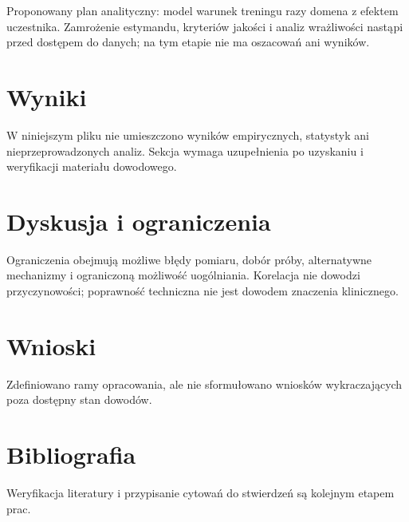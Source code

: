 \documentclass[11pt,a4paper]{article}
\begin{document}
Proponowany plan analityczny: model warunek treningu razy domena z efektem uczestnika. Zamrożenie estymandu, kryteriów jakości i analiz wrażliwości nastąpi przed dostępem do danych; na tym etapie nie ma oszacowań ani wyników.

\section{Wyniki}

W niniejszym pliku nie umieszczono wyników empirycznych, statystyk ani nieprzeprowadzonych analiz. Sekcja wymaga uzupełnienia po uzyskaniu i weryfikacji materiału dowodowego.

\section{Dyskusja i ograniczenia}

Ograniczenia obejmują możliwe błędy pomiaru, dobór próby, alternatywne mechanizmy i ograniczoną możliwość uogólniania. Korelacja nie dowodzi przyczynowości; poprawność techniczna nie jest dowodem znaczenia klinicznego.

\section{Wnioski}

Zdefiniowano ramy opracowania, ale nie sformułowano wniosków wykraczających poza dostępny stan dowodów.

\section*{Bibliografia}

Weryfikacja literatury i przypisanie cytowań do stwierdzeń są kolejnym etapem prac.
\end{document}
